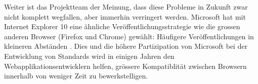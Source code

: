 Weiter ist das Projektteam der Meinung, dass diese Probleme in Zukunft zwar nicht komplett wegfallen, aber immerhin verringert werden. Microsoft hat mit Internet Explorer 10 eine ähnliche Veröffentlichungsstrategie wie die grossen anderen Browser (Firefox und Chrome) gewählt: Häufigere Veröffentlichungen in kleineren Abständen \cite{MicrosoftQuickensIEReleaseCycle}. Dies und die höhere Partizipation von Microsoft bei der Entwicklung von Standards wird in einigen Jahren den Webapplikationsentwicklern helfen, grössere Kompatiblität zwischen Browsern innerhalb von weniger Zeit zu bewerkstelligen.